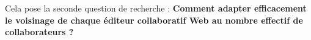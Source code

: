 
Cela pose la seconde question de recherche : \textbf{Comment adapter
  efficacement le voisinage de chaque éditeur collaboratif Web au nombre
  effectif de collaborateurs ?}



